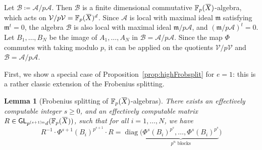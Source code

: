 \documentclass[letterpaper, 11pt, thm-restate]{article}
\numberwithin{equation}{section}
\newcommand{\F}{\mathbb{F}}
\newcommand{\GL}{\mathsf{GL}}
\newcommand{\diag}{\operatorname{diag}}
\newcommand{\mV}{\mathcal{V}}
\newcommand{\mA}{\mathcal{A}}
\newcommand{\mB}{\mathcal{B}}
\newcommand{\oX}{\mkern 1.5mu\overline{\mkern-1.5mu X \mkern-1.5mu}\mkern 1.5mu}
\newcommand{\frm}{\mathfrak{m}}
\newtheorem{lem}[thrm]{Lemma}
\theoremstyle{definition}
\theoremstyle{definition}
\theoremstyle{definition}
\begin{document}
Let $\mB \coloneqq \mA/p\mA$. Then $\mB$ is a finite dimensional commutative $\F_p(\oX)$-algebra, which acts on $\mV/p\mV = \F_p(\oX)^d$.
Since $\mA$ is local with maximal ideal $\frm$ satisfying $\frm^t = 0$, the algebra $\mB$ is also local with maximal ideal $\frm/p\mA$, and $(\frm/p\mA)^t = 0$.
Let $B_1, \ldots, B_N$ be the image of $A_1, \ldots, A_N$ in $\mB = \mA/p\mA$.
Since the map $\Phi$ commutes with taking modulo $p$, it can be applied on the quotients $\mV/p\mV$ and $\mB = \mA/p\mA$.

First, we show a special case of Proposition~\ref{prop:highFrobsplit} for $e = 1$: this is a rather classic extension of the Frobenius splitting.

\begin{lem}[Frobenius splitting of $\F_p(\oX)$-algebras]\label{lem:Frobp}
    There exists an effectively computable integer $s \geq 0$, and an effectively computable matrix $R \in \GL_{p^{(s+1)n} d}(\F_p(\oX))$, such that for all $i = 1, \ldots, N$, we have
    \begin{equation}
    R^{-1} \cdot \Phi^{s+1}(B_i)^{p^{s+1}} \cdot R = \diag\Big(\underbrace{\Phi^{s}(B_i)^{p^s}, \ldots, \Phi^{s}(B_i)^{p^s}}_{p^n \text{ blocks}}\Big) 
    \end{equation}
\end{lem}
\end{document}
